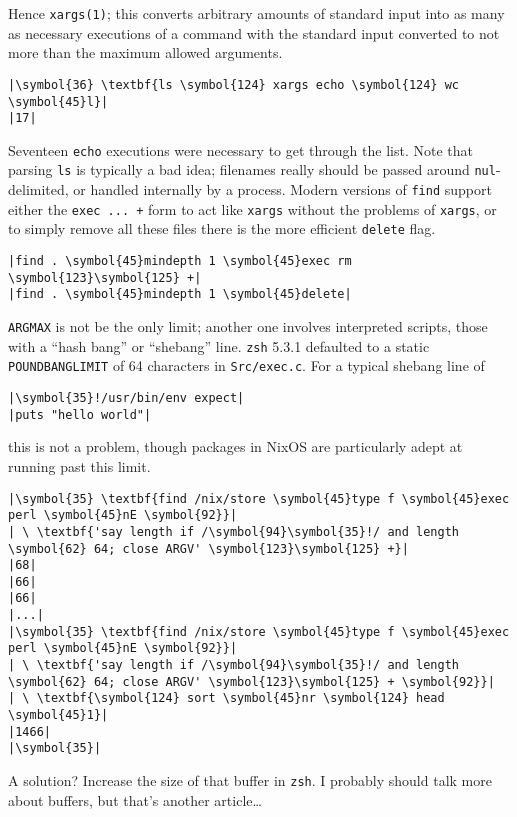 \documentclass[10pt,a4paper]{article}
\begin{document}
Hence \texttt{xargs(1)}; this converts arbitrary amounts of standard
input into as many as necessary executions of a command with the
standard input converted to not more than the maximum allowed arguments.

\begin{lstlisting}
|\symbol{36} \textbf{ls \symbol{124} xargs echo \symbol{124} wc \symbol{45}l}|
|17|
\end{lstlisting}

Seventeen \texttt{echo} executions were necessary to get through the
list. Note that parsing \texttt{ls} is typically a bad idea; filenames
really should be passed around \texttt{nul}-delimited, or handled
internally by a process. Modern versions of \texttt{find} support either
the \texttt{exec ...  +} form to act
like \texttt{xargs} without the problems of \texttt{xargs}, or to simply
remove all these files there is the more efficient
\texttt{delete} flag.

\begin{lstlisting}
|find . \symbol{45}mindepth 1 \symbol{45}exec rm \symbol{123}\symbol{125} +|
|find . \symbol{45}mindepth 1 \symbol{45}delete|
\end{lstlisting}

\texttt{ARGMAX} is not be the only limit; another one
involves interpreted scripts, those with a ``hash bang'' or ``shebang''
line. \texttt{zsh} 5.3.1 defaulted to a static \texttt{POUNDBANGLIMIT}
of 64 characters in \texttt{Src/exec.c}. For a typical shebang line of

\begin{lstlisting}
|\symbol{35}!/usr/bin/env expect|
|puts "hello world"|
\end{lstlisting}

this is not a problem, though packages in NixOS are particularly adept
at running past this limit.

\begin{lstlisting}
|\symbol{35} \textbf{find /nix/store \symbol{45}type f \symbol{45}exec perl \symbol{45}nE \symbol{92}}|
| \ \textbf{'say length if /\symbol{94}\symbol{35}!/ and length \symbol{62} 64; close ARGV' \symbol{123}\symbol{125} +}|
|68|
|66|
|66|
|...|
|\symbol{35} \textbf{find /nix/store \symbol{45}type f \symbol{45}exec perl \symbol{45}nE \symbol{92}}|
| \ \textbf{'say length if /\symbol{94}\symbol{35}!/ and length \symbol{62} 64; close ARGV' \symbol{123}\symbol{125} + \symbol{92}}|
| \ \textbf{\symbol{124} sort \symbol{45}nr \symbol{124} head \symbol{45}1}|
|1466|
|\symbol{35}|
\end{lstlisting}

A solution? Increase the size of that buffer in \texttt{zsh}. I probably
should talk more about buffers, but that's another article\ldots


\end{document}
